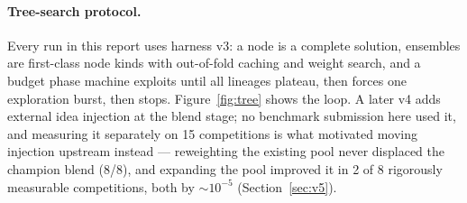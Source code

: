 \documentclass[11pt,a4paper]{article}
\begin{document}
\paragraph{Tree-search protocol.} Every run in this report uses harness v3: a node is a
complete solution, ensembles are first-class node kinds with out-of-fold caching and weight
search, and a budget phase machine exploits until all lineages plateau, then forces one
exploration burst, then stops. Figure~\ref{fig:tree} shows the loop. A later v4 adds external
idea injection at the blend stage; no benchmark submission here used it, and measuring it
separately on 15 competitions is what motivated moving injection upstream instead --- reweighting
the existing pool never displaced the champion blend (8/8), and expanding the pool improved it in
2 of 8 rigorously measurable competitions, both by ${\sim}10^{-5}$ (Section~\ref{sec:v5}).
\end{document}
